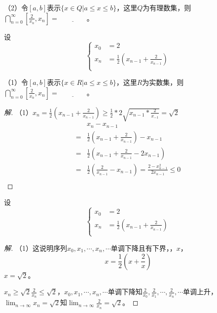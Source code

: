 \documentclass{beamer}
\begin{document}
\begin{CJK*}{UTF8}{gbsn}
\begin{frame}[t]
\begin{Exercise}
  （2）令$[a,b]$表示$\{x\in Q|a\leq x \leq b\}$，这里$Q$为有理数集，则$\bigcap_{n=0}^{\infty}[\frac{2}{x_n},x_n]=\underline{\quad\quad\quad\quad}$。
  \end{Exercise}
\end{frame}
\begin{frame}
  \begin{Exercise}
    设\[
    \begin{cases}
      x_0&=2\\
      x_n&=\frac{1}{2}(x_{n-1}+\frac{2}{x_{n-1}})\\
    \end{cases}
    \]
  \end{Exercise}
  （1）令$[a,b]$表示$\{x\in R|a\leq x \leq b\}$，这里$R$为实数集，则$\bigcap_{n=0}^{\infty}[\frac{2}{x_n},x_n]=\underline{\quad\quad\quad\quad}$。
  \pause
  \begin{proof}[解]\pause
   （1）$x_n=\frac{1}{2}(x_{n-1}+\frac{2}{x_{n-1}})\geq \frac{1}{2}*2\sqrt{x_{n-1}*\frac{2}{x_{-1}}}=\sqrt{2}$\pause
    \begin{align*}
      &x_n-x_{n-1}\\
      =&\frac{1}{2}(x_{n-1}+\frac{2}{x_{n-1}})-x_{n-1}\\
      =&\frac{1}{2}(x_{n-1}+\frac{2}{x_{n-1}}-2x_{n-1})\\
      =&\frac{1}{2}(\frac{2}{x_{n-1}}-x_{n-1})=\frac{2-x_{n-1}^2}{2x_{n-1}}\leq 0\\
    \end{align*}
 \end{proof}  
\end{frame}
\begin{frame}[t]
  \begin{Exercise}
    设\[
    \begin{cases}
      x_0&=2\\
      x_n&=\frac{1}{2}(x_{n-1}+\frac{2}{x_{n-1}})\\
    \end{cases}
    \]
  \end{Exercise} 
\begin{proof}[解]\pause\justifying\let\raggedright\justifying
  （1）这说明序列$x_0,x_1,\cdots,x_n,\cdots$单调下降且有下界，，$x$，
  \[x=\frac{1}{2}(x+\frac{2}{x})\]
  $x=\sqrt{2}$。

  $x_n\geq \sqrt{2}$$\frac{2}{x_n}\leq \sqrt{2}$，$x_0,x_1,\cdots,x_n,\cdots$单调下降知$\frac{2}{x_0},\frac{2}{x_1},\cdots,\frac{2}{x_n},\cdots$单调上升，
$\lim_{n\to \infty}x_n=\sqrt{2}$知$\lim_{n\to \infty}\frac{2}{x_{n}}=\sqrt{2}$。


\end{proof}
\end{frame}
\end{CJK*}
\end{document}
